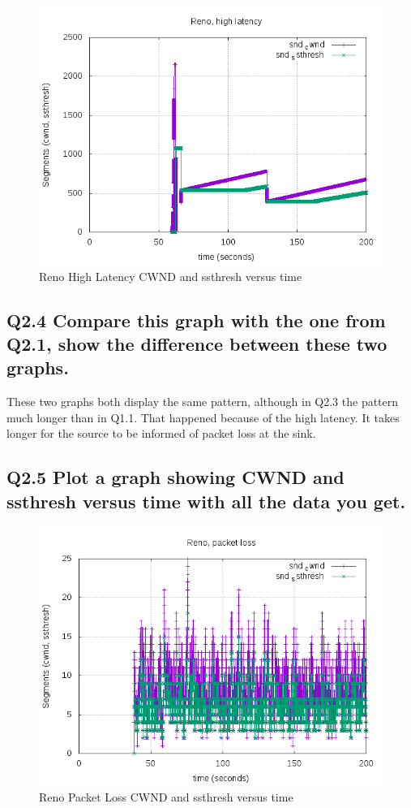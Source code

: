 \documentclass{article}
\begin{document}
\begin{figure}[H]
\centering
\includegraphics[width=12cm]{figures/RenoHLcwnd.png}
\caption{Reno High Latency CWND and ssthresh versus time}
\end{figure}

\subsection{Q2.4 Compare this graph with the one from Q2.1, show the difference between these two
graphs.}

These two graphs both display the same pattern, although in Q2.3 the pattern much longer than in Q1.1. That happened because of the high latency. It takes longer for the source to be informed of packet loss at the sink.

\subsection{Q2.5 Plot a graph showing CWND and ssthresh versus time with
all the data you get.}

\begin{figure}[H]
\centering
\includegraphics[width=12cm]{figures/RenoPLcwnd.png}
\caption{Reno Packet Loss CWND and ssthresh versus time}
\end{figure}
\end{document}
